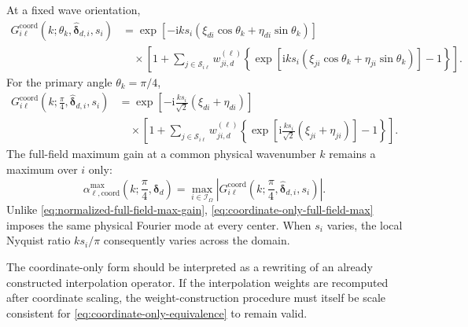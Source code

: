 \documentclass[11pt]{article}
\numberwithin{equation}{section}
\newcommand{\ii}{\mathrm{i}}
\begin{document}
At a fixed wave orientation,
\begin{equation}
\begin{aligned}
    G_{i\ell}^{\mathrm{coord}}
    \!\left(k;\theta_k,\widehat{\bm{\delta}}_{d,i},s_i\right)
    &=
    \exp\!\left[-\ii ks_i\left(
        \xi_{di}\cos\theta_k
        +
        \eta_{di}\sin\theta_k
    \right)\right]
    \\
    &\quad\times
    \left[
        1+
        \sum_{j\in\mathcal S_{i\ell}}
        w_{ji,d}^{(\ell)}
        \left\{
            \exp\!\left[\ii ks_i\left(
                \xi_{ji}\cos\theta_k
                +
                \eta_{ji}\sin\theta_k
            \right)\right]-1
        \right\}
    \right].
    \label{eq:G-coordinate-directional}
\end{aligned}
\end{equation}
For the primary angle $\theta_k=\pi/4$,
\begin{equation}
\boxed{
\begin{aligned}
    G_{i\ell}^{\mathrm{coord}}
    \!\left(k;\frac{\pi}{4},\widehat{\bm{\delta}}_{d,i},s_i\right)
    &=
    \exp\!\left[-\ii\frac{ks_i}{\sqrt{2}}
        \left(\xi_{di}+\eta_{di}\right)\right]
    \\
    &\quad\times
    \left[
        1+
        \sum_{j\in\mathcal S_{i\ell}}
        w_{ji,d}^{(\ell)}
        \left\{
            \exp\!\left[\ii\frac{ks_i}{\sqrt{2}}
                \left(\xi_{ji}+\eta_{ji}\right)\right]-1
        \right\}
    \right].
\end{aligned}
}
\label{eq:G-coordinate-primary-angle}
\end{equation}
The full-field maximum gain at a common physical wavenumber $k$ remains a maximum over $i$ only:
\begin{equation}
    \boxed{
    \alpha_{\ell,\mathrm{coord}}^{\max}
    \!\left(k;\frac{\pi}{4},\bm{\delta}_d\right)
    =
    \max_{i\in\mathcal I_{\Omega}}
    \left|
        G_{i\ell}^{\mathrm{coord}}
        \!\left(k;\frac{\pi}{4},\widehat{\bm{\delta}}_{d,i},s_i\right)
    \right|.
    }
    \label{eq:coordinate-only-full-field-max}
\end{equation}
Unlike \cref{eq:normalized-full-field-max-gain}, \cref{eq:coordinate-only-full-field-max} imposes the same physical Fourier mode at every center. When $s_i$ varies, the local Nyquist ratio $ks_i/\pi$ consequently varies across the domain.

The coordinate-only form should be interpreted as a rewriting of an already constructed interpolation operator. If the interpolation weights are recomputed after coordinate scaling, the weight-construction procedure must itself be scale consistent for \cref{eq:coordinate-only-equivalence} to remain valid.
\end{document}
